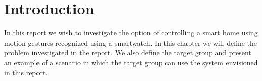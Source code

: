 \chapter{Introduction}
\label{chap:introduction}

In this report we wish to investigate the option of controlling a smart home using motion gestures recognized using a smartwatch. In this chapter we will define the problem investigated in the report. We also define the target group and present an example of a scenario in which the target group can use the system envisioned in this report.







% 


